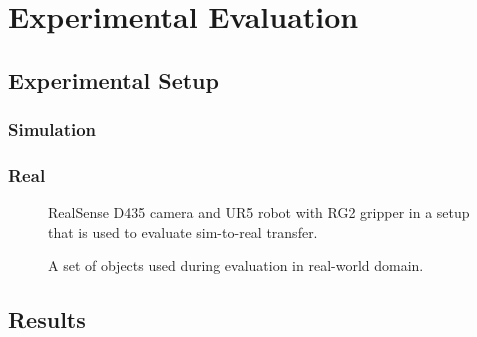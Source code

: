 \chapter{Experimental Evaluation}\label{ch:experimental_evaluation}



\section{Experimental Setup}


\subsection{Simulation}




\subsection{Real}


\begin{figure}[ht]
    \centering
    \caption{RealSense D435 camera and UR5 robot with RG2 gripper in a setup that is used to evaluate sim-to-real transfer.}
    \label{fig:real_setup}
\end{figure}

\begin{figure}[ht]
    \centering
    \caption{A set of objects used during evaluation in real-world domain.}
    \label{fig:real_objects}
\end{figure}



\section{Results}

